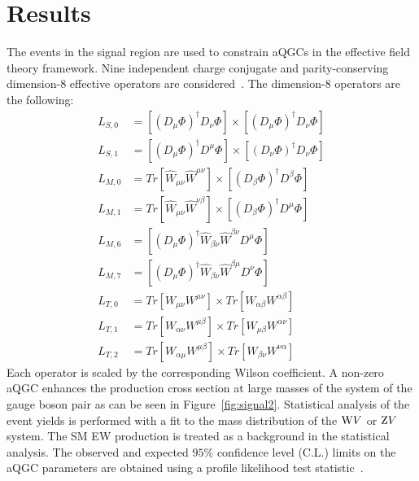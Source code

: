 \section{Results} %
\label{sec:results}
The events in the signal region are used to constrain aQGCs in the effective field theory framework. Nine independent charge conjugate and parity-conserving dimension-8 effective operators are considered~\cite{aqgc_operators}. The dimension-8 operators are the following: 
%
\begin{align*}
L_{S,0} &= \left[\left(D_{\mu} \Phi\right)^{\dagger} D_{\nu} \Phi \right] \times \left[\left(D_{\mu} \Phi\right)^{\dagger} D_{\nu} \Phi \right] \\
L_{S,1} &= \left[\left(D_{\mu} \Phi\right)^{\dagger} D^{\mu} \Phi \right] \times \left[\left(D_{\nu} \Phi\right)^{\dagger} D_{\nu} \Phi \right] \\
L_{M,0} &= Tr[\hat{W}_{\mu \nu} \hat{W}^{\mu \nu}] \times \left[ \left(D_{\beta} \Phi\right)^{\dagger} D^{\beta} \Phi \right] \\
L_{M,1} &= Tr[\hat{W}_{\mu \nu} \hat{W}^{\nu \beta}] \times \left[ \left(D_{\beta} \Phi\right)^{\dagger} D^{\mu} \Phi \right] \\
L_{M,6} &= \left[\left(D_{\mu} \Phi\right)^{\dagger}  \hat{W}_{\beta \nu} \hat{W}^{\beta \nu}  D^{\mu} \Phi \right] \\
L_{M,7} &= \left[\left(D_{\mu} \Phi\right)^{\dagger} \hat{W}_{\beta \nu} \hat{W}^{\beta \mu} D^{\nu} \Phi \right ] \\
L_{T,0} &= Tr \left[W_{\mu \nu} W^{\mu \nu} \right] \times Tr \left[W_{\alpha \beta} W^{\alpha \beta} \right] \\
L_{T,1} &= Tr \left[W_{\alpha \nu} W^{\mu \beta} \right] \times Tr \left[W_{\mu \beta} W^{\alpha \nu} \right] \\
L_{T,2} &= Tr \left[W_{\alpha \mu} W^{\mu \beta} \right] \times Tr \left[W_{\beta \nu} W^{\nu \alpha} \right]
\end{align*}
%
Each operator is scaled by the corresponding Wilson coefficient. A non-zero aQGC enhances the production cross section at large masses of the system of the gauge boson pair as can be seen in Figure~\ref{fig:signal2}. Statistical analysis of the event yields is performed with a fit to the mass distribution of the $\mathrm{W} V$ or $\mathrm{Z} V$ system. The SM EW production is treated as a background in the statistical analysis. The observed and expected $95\%$ confidence level (C.L.) limits on the aQGC parameters are obtained using a profile likelihood test statistic~\cite{Junk,Read,Cowan2011}. 

